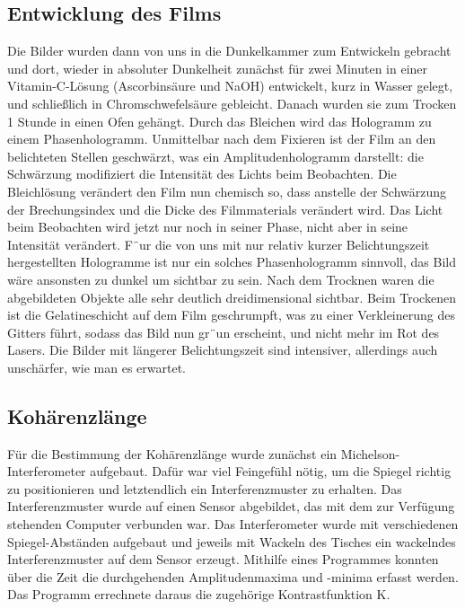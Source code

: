 \documentclass[10pt,a4paper]{article}
\begin{document}
\subsection{Entwicklung des Films}



Die Bilder wurden dann von uns in die Dunkelkammer zum Entwickeln gebracht und dort, wieder in absoluter Dunkelheit zunächst für zwei Minuten in einer Vitamin-C-Lösung (Ascorbinsäure und NaOH) entwickelt, kurz in Wasser gelegt, und schließlich in Chromschwefelsäure gebleicht. Danach wurden sie zum Trocken 1 Stunde in einen Ofen gehängt. Durch das Bleichen wird das Hologramm zu einem Phasenhologramm. 
Unmittelbar nach dem Fixieren ist der Film an den belichteten Stellen geschwärzt, was ein Amplitudenhologramm darstellt: die Schwärzung modiﬁziert die Intensität des Lichts beim Beobachten. Die Bleichlösung verändert den Film nun 
chemisch so, dass anstelle der Schwärzung der Brechungsindex und die Dicke des Filmmaterials verändert wird. Das Licht beim Beobachten wird jetzt nur noch in seiner Phase, nicht aber in seine Intensität verändert. F¨ur die von uns mit nur relativ kurzer Belichtungszeit hergestellten Hologramme ist nur ein solches Phasenhologramm sinnvoll, das Bild wäre ansonsten zu dunkel um sichtbar zu sein. Nach dem Trocknen waren die abgebildeten Objekte alle sehr deutlich dreidimensional sichtbar. Beim Trockenen ist die Gelatineschicht auf dem Film geschrumpft, was zu einer Verkleinerung des Gitters führt, sodass das Bild nun gr¨un erscheint, und nicht mehr im Rot des Lasers. Die Bilder mit längerer Belichtungszeit sind intensiver, allerdings auch unschärfer, wie man es erwartet.

\subsection{Kohärenzlänge}

Für die Bestimmung der Kohärenzlänge wurde zunächst ein Michelson-Interferometer aufgebaut. Dafür war viel Feingefühl nötig, um die Spiegel richtig zu positionieren und letztendlich ein Interferenzmuster zu erhalten. Das Interferenzmuster wurde auf einen Sensor abgebildet, das mit dem zur Verfügung stehenden Computer verbunden war. Das Interferometer wurde mit verschiedenen Spiegel-Abständen aufgebaut und jeweils mit Wackeln des Tisches ein wackelndes Interferenzmuster auf dem Sensor erzeugt. Mithilfe eines Programmes konnten über die Zeit die durchgehenden Amplitudenmaxima und -minima erfasst werden. Das Programm errechnete daraus die zugehörige Kontrastfunktion K. 
\end{document}
